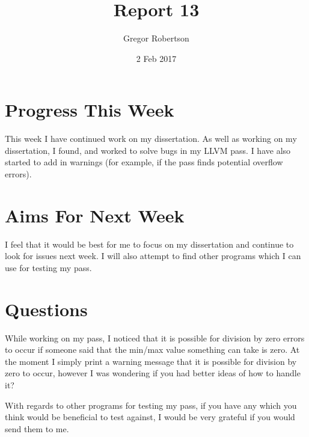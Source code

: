 \documentclass{article}
\title{Report 13}
\author{Gregor Robertson}
\date{2 Feb 2017}
\begin{document}
 
\maketitle
 
\section*{Progress This Week}
This week I have continued work on my dissertation. As well as working on my dissertation, I found, and worked to solve bugs in my LLVM pass. I have also started to add in warnings (for example, if the pass finds potential overflow errors).

\section*{Aims For Next Week}
I feel that it would be best for me to focus on my dissertation and continue to look for issues next week. I will also attempt to find other programs which I can use for testing my pass. 

\section*{Questions}
While working on my pass, I noticed that it is possible for division by zero errors to occur if someone said that the min/max value something can take is zero. At the moment I simply print a warning message that it is possible for division by zero to occur, however I was wondering if you had better ideas of how to handle it?

With regards to other programs for testing my pass, if you have any which you think would be beneficial to test against, I would be very grateful if you would send them to me. 
\medskip
 
\printbibliography
\end{document}
